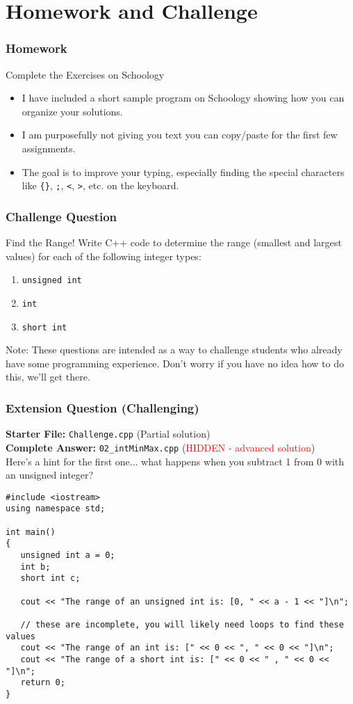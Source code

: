 \documentclass{beamer}
\begin{document}
\section{Homework and Challenge}

\begin{frame}
\frametitle{Homework}
\begin{block}{Complete the Exercises on Schoology}
\begin{itemize}
    \item I have included a short sample program on Schoology showing how you can organize your solutions.
    \item I am purposefully not giving you text you can copy/paste for the first few assignments.
    \item The goal is to improve your typing, especially finding the special characters like \texttt{\{\}}, \texttt{;}, \texttt{<}, \texttt{>}, etc. on the keyboard.
\end{itemize}
\end{block}
\end{frame}

\begin{frame}[fragile]
\frametitle{Challenge Question}
\begin{exampleblock}{Find the Range!}
Write C++ code to determine the range (smallest and largest values) for each of the following integer types:
\begin{enumerate}
    \item \texttt{unsigned int}
    \item \texttt{int}
    \item \texttt{short int}
\end{enumerate}
Note: These questions are intended as a way to challenge students who already have some programming experience. Don't worry if you have no idea how to do this, we'll get there.
\end{exampleblock}
\end{frame}

\begin{frame}[fragile]
\frametitle{Extension Question (Challenging)}
\textbf{Starter File:} \texttt{Challenge.cpp} (Partial solution)
\\\textbf{Complete Answer:} \texttt{02\_intMinMax.cpp} (\textcolor{red}{HIDDEN - advanced solution})
\\Here's a hint for the first one... what happens when you subtract 1 from 0 with an unsigned integer?
\pause
\begin{verbatim}
#include <iostream>
using namespace std;

int main()
{
   unsigned int a = 0;
   int b;
   short int c;
   
   cout << "The range of an unsigned int is: [0, " << a - 1 << "]\n";
   
   // these are incomplete, you will likely need loops to find these values
   cout << "The range of an int is: [" << 0 << ", " << 0 << "]\n";
   cout << "The range of a short int is: [" << 0 << " , " << 0 << "]\n";
   return 0;
}
\end{verbatim}
\end{frame}
\end{document}
